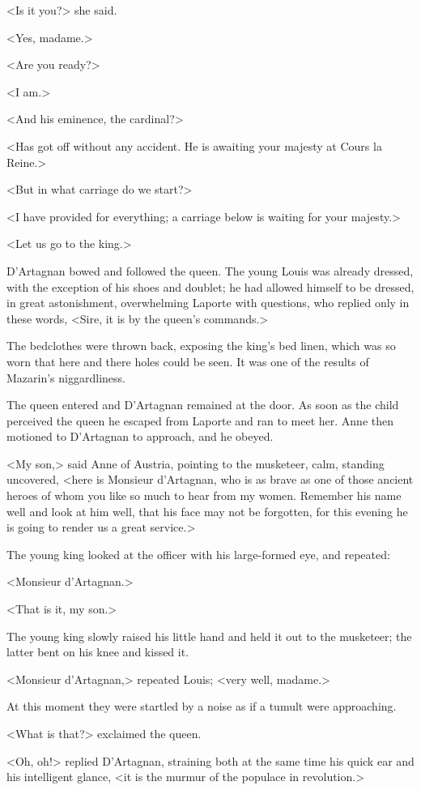 <Is it you?> she said.

<Yes, madame.>

<Are you ready?>

<I am.>

<And his eminence, the cardinal?>

<Has got off without any accident. He is awaiting your majesty at Cours la Reine.>

<But in what carriage do we start?>

<I have provided for everything; a carriage below is waiting for your majesty.>

<Let us go to the king.>

D'Artagnan bowed and followed the queen. The young Louis was already dressed, with the exception of his shoes and doublet; he had allowed himself to be dressed, in great astonishment, overwhelming Laporte with questions, who replied only in these words, <Sire, it is by the queen's commands.>

The bedclothes were thrown back, exposing the king's bed linen, which was so worn that here and there holes could be seen. It was one of the results of Mazarin's niggardliness.

The queen entered and D'Artagnan remained at the door. As soon as the child perceived the queen he escaped from Laporte and ran to meet her. Anne then motioned to D'Artagnan to approach, and he obeyed.

<My son,> said Anne of Austria, pointing to the musketeer, calm, standing uncovered, <here is Monsieur d'Artagnan, who is as brave as one of those ancient heroes of whom you like so much to hear from my women. Remember his name well and look at him well, that his face may not be forgotten, for this evening he is going to render us a great service.>

The young king looked at the officer with his large-formed eye, and repeated:

<Monsieur d'Artagnan.>

<That is it, my son.>

The young king slowly raised his little hand and held it out to the musketeer; the latter bent on his knee and kissed it.

<Monsieur d'Artagnan,> repeated Louis; <very well, madame.>

At this moment they were startled by a noise as if a tumult were approaching.

<What is that?> exclaimed the queen.

<Oh, oh!> replied D'Artagnan, straining both at the same time his quick ear and his intelligent glance, <it is the murmur of the populace in revolution.>

